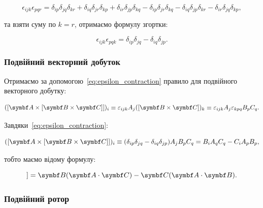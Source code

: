 \begin{equation*}
\epsilon_{ijk} \epsilon_{pqr} = \delta_{ip} \delta_{jq} \delta_{kr} + \delta_{iq} \delta_{jr} \delta_{kp} + \delta_{ir} \delta_{jp} \delta_{kq} -
\delta_{ip} \delta_{jr} \delta_{kq} - \delta_{iq} \delta_{jp} \delta_{kr} - \delta_{ir} \delta_{jq} \delta_{kp},
\end{equation*}

та взяти суму по \( k = r \), отримаємо формулу згортки:

\begin{equation}
\epsilon_{ijk} \epsilon_{pqk} = \delta_{ip} \delta_{jq} - \delta_{iq} \delta_{jp}.
\label{eq:epsilon_contraction}
\end{equation}

\subsubsection{Подвійний векторний добуток}

Отримаємо за допомогою~\eqref{eq:epsilon_contraction} правило для подвійного векторного добутку:

\begin{equation*}
([\vect{A} \times [\Bfield \times \vect{C}]])_i \equiv \epsilon_{ijk} A_j ([\Bfield \times \vect{C}])_k \equiv \epsilon_{ijk} A_j
\epsilon_{kpq} B_p C_q.
\end{equation*}

Завдяки~\eqref{eq:epsilon_contraction}:

\begin{equation*}
([\vect{A} \times [\Bfield \times \vect{C}]])_i \equiv (\delta_{ip} \delta_{jq} - \delta_{iq} \delta_{jp}) A_j B_p C_q = B_i A_q C_q - C_i A_p B_p,
\end{equation*}

тобто маємо відому формулу:

\begin{equation*}
[\vect{A} \times [\Bfield \times \vect{C}]] = \Bfield(\vect{A} \cdot \vect{C}) - \vect{C}(\vect{A} \cdot \Bfield).
\end{equation*}


\subsubsection{Подвійний ротор}

